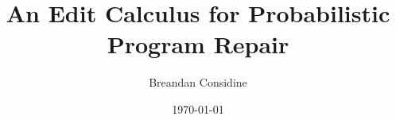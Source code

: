 \documentclass[12pt,oneside]{book}
\title{An Edit Calculus for Probabilistic Program Repair}
\author{Breandan Considine}
\date{\today}
\begin{document}
\newcommand{\mcgillguidelines}{\href{https://www.mcgill.ca/gps/thesis/thesis-guidelines/preparation}{Official McGill Guidelines: }}


\begin{onehalfspacing}
\pagestyle{empty}

\cleardoublepage
\end{onehalfspacing}


\pagestyle{plain}



\clearpage

\cleardoublepage



\clearpage



\clearpage


\tableofcontents
\listoffigures
\listoftables
\clearpage



\clearpage




%









\end{document}
